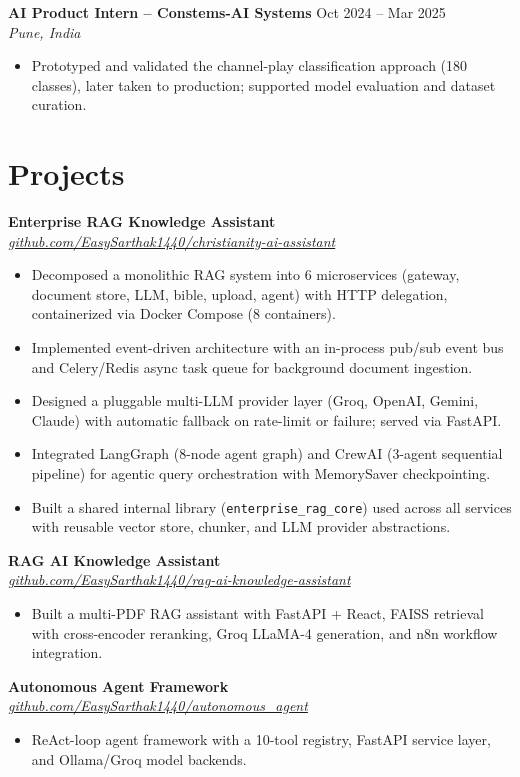 \documentclass[9.5pt,a4paper]{article}
\newcommand{\resumeItem}[1]{\item[--] #1}
\newcommand{\resumeEntry}[4]{
  \textbf{#1} \hfill #2 \\
  \textit{#3} \hfill \textit{#4}
}
\begin{document}
\resumeEntry{AI Product Intern -- Constems-AI Systems}{Oct 2024 -- Mar 2025}{Pune, India}{}
\begin{itemize}[leftmargin=14pt, itemsep=1pt, topsep=2pt]
  \resumeItem{Prototyped and validated the channel-play classification approach (180 classes), later taken to production; supported model evaluation and dataset curation.}
\end{itemize}

\section*{Projects}
\resumeEntry{Enterprise RAG Knowledge Assistant}{}{}{\href{https://github.com/EasySarthak1440/christianity-ai-assistant}{github.com/EasySarthak1440/christianity-ai-assistant}}
\begin{itemize}[leftmargin=14pt, itemsep=1pt, topsep=2pt]
  \resumeItem{Decomposed a monolithic RAG system into 6 microservices (gateway, document store, LLM, bible, upload, agent) with HTTP delegation, containerized via Docker Compose (8 containers).}
  \resumeItem{Implemented event-driven architecture with an in-process pub/sub event bus and Celery/Redis async task queue for background document ingestion.}
  \resumeItem{Designed a pluggable multi-LLM provider layer (Groq, OpenAI, Gemini, Claude) with automatic fallback on rate-limit or failure; served via FastAPI.}
  \resumeItem{Integrated LangGraph (8-node agent graph) and CrewAI (3-agent sequential pipeline) for agentic query orchestration with MemorySaver checkpointing.}
  \resumeItem{Built a shared internal library (\texttt{enterprise\_rag\_core}) used across all services with reusable vector store, chunker, and LLM provider abstractions.}
\end{itemize}

\resumeEntry{RAG AI Knowledge Assistant}{}{}{\href{https://github.com/EasySarthak1440/rag-ai-knowledge-assistant}{github.com/EasySarthak1440/rag-ai-knowledge-assistant}}
\begin{itemize}[leftmargin=14pt, itemsep=1pt, topsep=2pt]
  \resumeItem{Built a multi-PDF RAG assistant with FastAPI + React, FAISS retrieval with cross-encoder reranking, Groq LLaMA-4 generation, and n8n workflow integration.}
\end{itemize}

\resumeEntry{Autonomous Agent Framework}{}{}{\href{https://github.com/EasySarthak1440/autonomous_agent}{github.com/EasySarthak1440/autonomous\_agent}}
\begin{itemize}[leftmargin=14pt, itemsep=1pt, topsep=1pt]
  \resumeItem{ReAct-loop agent framework with a 10-tool registry, FastAPI service layer, and Ollama/Groq model backends.}
\end{itemize}
\end{document}
